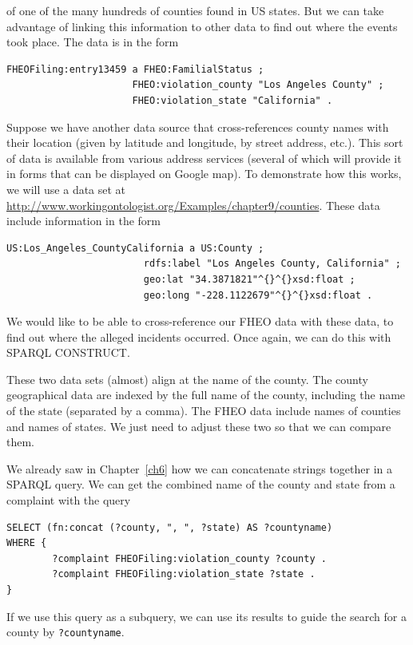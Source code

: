 of one of the many hundreds of counties found in US states. But we can
take advantage of linking this information to other data to find out
where the events took place. The data is in the form

\begin{lstlisting}
FHEOFiling:entry13459 a FHEO:FamilialStatus ; 
                      FHEO:violation_county "Los Angeles County" ; 
                      FHEO:violation_state "California" .
\end{lstlisting}

Suppose we have another data source that cross-references county names
with their location (given by latitude and longitude, by street address,
etc.). This sort of data is available from various address services
(several of which will provide it in forms that can be displayed on
Google map). To demonstrate how this works, we will use a data set at
\url{http://www.workingontologist.org/Examples/chapter9/counties}.
These data include information in the form

\begin{lstlisting}
US:Los_Angeles_CountyCalifornia a US:County ;
                        rdfs:label "Los Angeles County, California" ;
                        geo:lat "34.3871821"^{}^{}xsd:float ;
                        geo:long "-228.1122679"^{}^{}xsd:float .
\end{lstlisting}

We would like to be able to cross-reference our FHEO data with these
data, to find out where the alleged incidents occurred. Once again, we
can do this with SPARQL CONSTRUCT.

These two data sets (almost) align at the name of the county. The county
geographical data are indexed by the full name of the county, including
the name of the state (separated by a comma). The FHEO data include
names of counties and names of states. We just need to adjust these two
so that we can compare them.

We already saw in Chapter~\ref{ch6} how we can concatenate strings together in a
SPARQL query. We can get the combined name of the county and state from
a complaint with the query

\begin{lstlisting}
SELECT (fn:concat (?county, ", ", ?state) AS ?countyname)
WHERE {
        ?complaint FHEOFiling:violation_county ?county .
        ?complaint FHEOFiling:violation_state ?state .
}
\end{lstlisting}

If we use this query as a subquery, we can use its results to guide the
search for a county by
\texttt{?countyname}.

